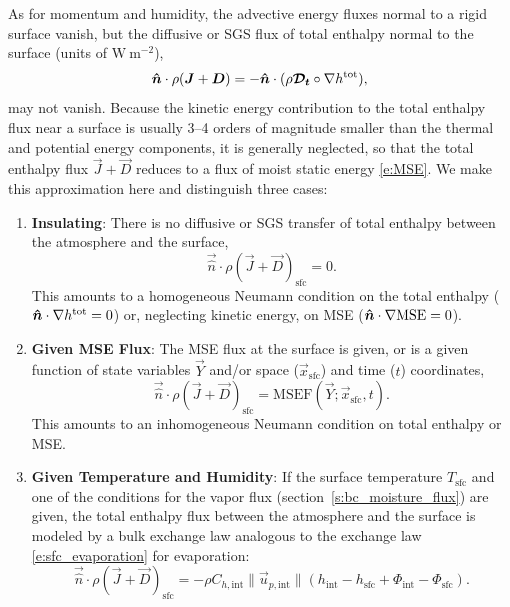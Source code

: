 \documentclass{report}
\begin{document}
As for momentum and humidity, the advective energy fluxes normal to a rigid surface vanish, but the diffusive or SGS flux of total enthalpy normal to the surface (units of $\mathrm{W~m^{-2}}$),
\[
\boldsymbol{{\hat n}} \cdot \rho (\boldsymbol{{J}} + \boldsymbol{{D}}) = -\boldsymbol{{\hat n}} \cdot (\rho \boldsymbol{{\mathcal{D}_t}} \circ \nabla h^{\mathrm{tot}}),
\]
may not vanish. Because the kinetic energy contribution to the total enthalpy flux near a surface is usually 3--4 orders of magnitude smaller than the thermal and potential energy components, it is generally neglected, so that the total enthalpy flux $\vec{J} + \vec{D}$ reduces to a flux of moist static energy \eqref{e:MSE}. We make this approximation here and distinguish three cases:
\begin{enumerate}
    \item \textbf{Insulating}: There is no diffusive or SGS transfer of total enthalpy between the atmosphere and the surface,
    \[
    \vec{\hat n} \cdot \rho (\vec{J} + \vec{D})_\mathrm{sfc} = 0.
    \]
    This amounts to a homogeneous Neumann condition on the total enthalpy ($\boldsymbol{{\hat n}} \cdot \nabla h^\mathrm{tot}=0$) or, neglecting kinetic energy, on MSE ($\boldsymbol{{\hat n}} \cdot \nabla \mathrm{MSE} =0$).
    \item \textbf{Given MSE Flux}: The MSE flux at the surface is given, or is a given function of state variables $\vec{Y}$ and/or space ($\vec{x}_\mathrm{sfc}$) and time ($t$) coordinates,
    \[
    \vec{\hat n} \cdot \rho (\vec{J} + \vec{D})_\mathrm{sfc} = \mathrm{MSEF}(\vec{Y}; \vec{x}_\mathrm{sfc}, t).
    \]
    This amounts to an inhomogeneous Neumann condition on total enthalpy or MSE.
    \item \textbf{Given Temperature and Humidity}: If the surface temperature $T_\mathrm{sfc}$ and one of the conditions for the vapor flux (section~\ref{s:bc_moisture_flux}) are given, the total enthalpy flux between the atmosphere and the surface is modeled by a bulk exchange law analogous to the exchange law \eqref{e:sfc_evaporation} for evaporation:
    \begin{equation}\label{e:sfc_energy_flux}
    \vec{\hat n} \cdot \rho (\vec{J} + \vec{D})_\mathrm{sfc} = -\rho C_{h, \mathrm{int}} \| \vec{u}_{p,\mathrm{int}} \| 
     \left( h_\mathrm{int} -h_\mathrm{sfc} + \Phi_\mathrm{int} -  \Phi_\mathrm{sfc} \right).
    \end{equation}

\end{enumerate}
\end{document}

